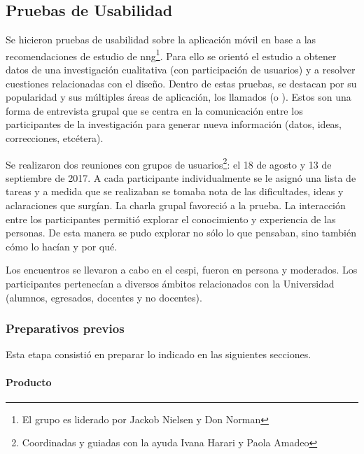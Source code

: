 \subsection{Pruebas de Usabilidad}
\label{desarrollo_pruebas_usabilidad}

Se hicieron pruebas de usabilidad sobre la aplicación móvil en base a las recomendaciones de estudio de \gls{nng}\cite{nng2017usabilityTest}\footnote{El grupo es liderado por Jackob Nielsen y Don Norman}. Para ello se orientó el estudio a obtener datos de una investigación cualitativa (con participación de usuarios) y a resolver cuestiones relacionadas con el diseño. 
Dentro de estas pruebas, se destacan por su popularidad y sus múltiples
áreas de aplicación, los llamados  (o ).
Estos son una forma de entrevista grupal que se centra en la comunicación entre los participantes de la investigación para generar nueva información (datos, ideas, correcciones, etcétera)\cite{kitzinger1995qualitative}.

Se realizaron dos reuniones con grupos de usuarios\footnote{Coordinadas y guiadas con la ayuda Ivana Harari y Paola Amadeo}: el 18 de agosto y 13 de septiembre de 2017. A cada participante individualmente se le asignó una lista de tareas y a medida que se realizaban se tomaba nota de las dificultades, ideas y aclaraciones que surgían. La charla grupal favoreció a la prueba. La interacción entre los participantes permitió explorar el conocimiento y experiencia de las personas. De esta manera se pudo explorar no sólo lo que pensaban, sino también cómo lo hacían y por qué.

Los encuentros se llevaron a cabo en el \gls{cespi}, fueron en persona y moderados. Los participantes pertenecían a diversos ámbitos relacionados con la Universidad (alumnos, egresados, docentes y no docentes).

\subsubsection{Preparativos previos}
\label{desarrollo_pruebas_usabilidad_preparativos}

Esta etapa consistió en preparar lo indicado en las siguientes secciones.

\paragraph{Producto}
\label{desarrollo_pruebas_usabilidad_preparativos_producto}

